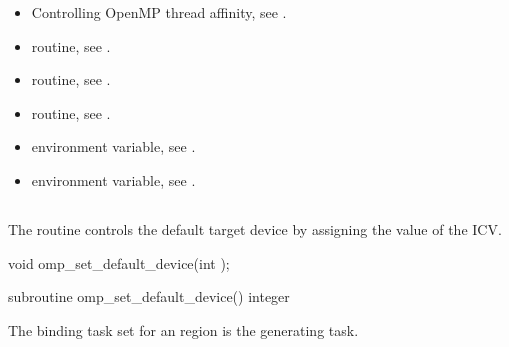\crossreferences
\begin{itemize}
\item Controlling OpenMP thread affinity, see
.

\item {} routine, 
see .

\item {} routine, 
see .

\item {} routine, see .

\item {} environment variable, see
.

\item {} environment variable, see
.
\end{itemize}



\subsection{}
\label{subsec:omp_set_default_device}

\summary

The  routine controls the default target device by
assigning the value of the  ICV.

\format
\begin{ccppspecific}
\begin{ompcFunction}
void omp_set_default_device(int );
\end{ompcFunction}
\end{ccppspecific}

\begin{fortranspecific}
\begin{ompfSubroutine}
subroutine omp_set_default_device()
integer 
\end{ompfSubroutine}
\end{fortranspecific}

\binding
The binding task set for an  
region is the generating task.

